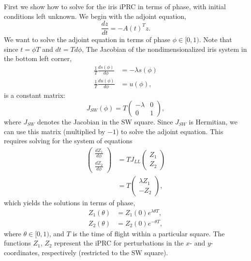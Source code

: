 \documentclass[a4paper,12pt]{article}
\begin{document}
First we show how to solve for the iris iPRC in terms of phase, with initial conditions left unknown.  We begin with the adjoint equation,
\begin{equation}
 \frac{dz}{dt} = -A(t)^T z.
\end{equation}
We want to solve the adjoint equation in terms of phase $\phi \in [0,1)$.  Note that since $t = \phi T$ and $d t = T d \phi$,  The Jacobian of the nondimensionalized iris system in the bottom left corner,
\begin{align}
 \frac{1}{T}\frac{ds(\phi)}{d\phi} &= -\lambda s(\phi)\\
 \frac{1}{T}\frac{du(\phi)}{d\phi} &= u(\phi),
\end{align}
is a constant matrix:
\begin{equation}
 J_{SW}(\phi) = T \left( \begin{array}{cc} -\lambda & 0 \\ 0 & 1 \end{array} \right ),
\end{equation}
where $J_{SW}$ denotes the Jacobian in the SW square.  Since $J_{SW}$ is Hermitian, we can use this matrix (multiplied by $-1$) to solve the adjoint equation.  This requires solving for the system of equations
\begin{align}
\left ( \begin{array}{c} \frac{dZ_1}{d\phi}\\ \frac{dZ_2}{d\phi} \end{array} \right )  &= T J_{LL} \left ( \begin{array}{c} Z_1 \\ Z_2 \end{array} \right)\\
&= T \left (\begin{array}{c}
    \lambda Z_1 \\ -Z_2
   \end{array} \right ),
\end{align}
which yields the solutions in terms of phase,
\begin{align}
 Z_1(\theta) & = Z_1(0) e^{\lambda \theta T},\\
 Z_2(\theta) & = Z_2(0) e^{-\theta T},
\end{align}
where $\theta \in [0,1)$, and $T$ is the time of flight within a particular square.  The functions $Z_1$, $Z_2$ represent the iPRC for perturbations in the $x$- and $y$- coordinates, respectively (restricted to the SW square).
\end{document}
